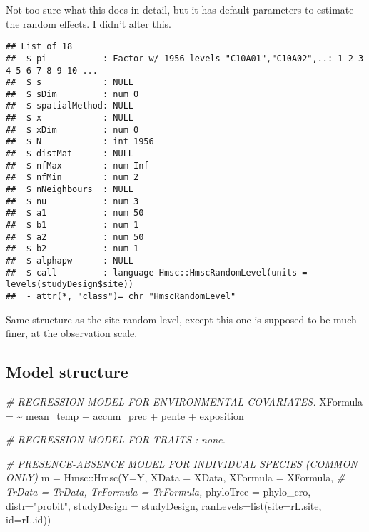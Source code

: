 \documentclass[
]{article}
\newenvironment{Shaded}{\begin{snugshade}}{\end{snugshade}}
\newcommand{\AttributeTok}[1]{\textcolor[rgb]{0.77,0.63,0.00}{#1}}
\newcommand{\CommentTok}[1]{\textcolor[rgb]{0.56,0.35,0.01}{\textit{#1}}}
\newcommand{\ErrorTok}[1]{\textcolor[rgb]{0.64,0.00,0.00}{\textbf{#1}}}
\newcommand{\FunctionTok}[1]{\textcolor[rgb]{0.00,0.00,0.00}{#1}}
\newcommand{\NormalTok}[1]{#1}
\newcommand{\OtherTok}[1]{\textcolor[rgb]{0.56,0.35,0.01}{#1}}
\newcommand{\SpecialCharTok}[1]{\textcolor[rgb]{0.00,0.00,0.00}{#1}}
\newcommand{\StringTok}[1]{\textcolor[rgb]{0.31,0.60,0.02}{#1}}
\begin{document}
Not too sure what this does in detail, but it has default parameters to
estimate the random effects. I didn't alter this.

\begin{Shaded}
\end{Shaded}

\begin{verbatim}
## List of 18
##  $ pi           : Factor w/ 1956 levels "C10A01","C10A02",..: 1 2 3 4 5 6 7 8 9 10 ...
##  $ s            : NULL
##  $ sDim         : num 0
##  $ spatialMethod: NULL
##  $ x            : NULL
##  $ xDim         : num 0
##  $ N            : int 1956
##  $ distMat      : NULL
##  $ nfMax        : num Inf
##  $ nfMin        : num 2
##  $ nNeighbours  : NULL
##  $ nu           : num 3
##  $ a1           : num 50
##  $ b1           : num 1
##  $ a2           : num 50
##  $ b2           : num 1
##  $ alphapw      : NULL
##  $ call         : language Hmsc::HmscRandomLevel(units = levels(studyDesign$site))
##  - attr(*, "class")= chr "HmscRandomLevel"
\end{verbatim}

Same structure as the site random level, except this one is supposed to
be much finer, at the observation scale.

\hypertarget{model-structure}{%
\subsection{Model structure}\label{model-structure}}

\begin{Shaded}
\begin{Highlighting}[]
\CommentTok{\# REGRESSION MODEL FOR ENVIRONMENTAL COVARIATES.}
\NormalTok{XFormula }\OtherTok{=} \ErrorTok{\textasciitilde{}}\NormalTok{ mean\_temp }\SpecialCharTok{+}\NormalTok{ accum\_prec }\SpecialCharTok{+}\NormalTok{ pente }\SpecialCharTok{+}\NormalTok{ exposition}

\CommentTok{\# REGRESSION MODEL FOR TRAITS : none.}

\CommentTok{\# PRESENCE{-}ABSENCE MODEL FOR INDIVIDUAL SPECIES (COMMON ONLY)}
\NormalTok{m }\OtherTok{=}\NormalTok{ Hmsc}\SpecialCharTok{::}\FunctionTok{Hmsc}\NormalTok{(}\AttributeTok{Y=}\NormalTok{Y, }\AttributeTok{XData =}\NormalTok{ XData,  }\AttributeTok{XFormula =}\NormalTok{ XFormula,}
         \CommentTok{\# TrData = TrData, TrFormula = TrFormula,}
         \AttributeTok{phyloTree =}\NormalTok{ phylo\_cro,}
         \AttributeTok{distr=}\StringTok{"probit"}\NormalTok{,}
         \AttributeTok{studyDesign =}\NormalTok{ studyDesign, }\AttributeTok{ranLevels=}\FunctionTok{list}\NormalTok{(}\AttributeTok{site=}\NormalTok{rL.site, }\AttributeTok{id=}\NormalTok{rL.id))}
\end{Highlighting}
\end{Shaded}
\end{document}
